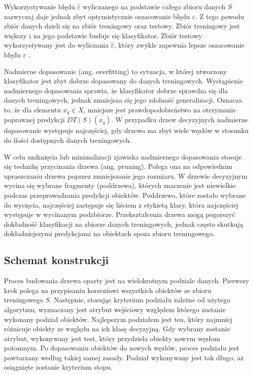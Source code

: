 \documentclass[12pt]{article}
\begin{document}
\vspace{0.8cm}

Wykorzystywanie błędu $\hat{\varepsilon}$ wyliczanego na podstawie całego zbioru danych $S$ zazwyczaj daje jednak
zbyt optymistycznie oszacowanie błędu $\varepsilon$. Z tego powodu zbiór danych dzieli się na zbiór
treningowy oraz testowy. Zbiór treningowy jest większy i na jego podstawie buduje się klasyfikator.
Zbiór testowy wykorzystywany jest do wyliczania $\hat{\varepsilon}$, który zwykle zapewnia
lepsze oszacowanie błędu $\varepsilon$ \cite{data-mining-with-decision-trees}.

Nadmierne dopasowanie (ang. overfitting) to sytuacja, w której utworzony klasyfikator jest zbyt
dobrze dopasowany do danych treningowych. Wystąpienie nadmiernego dopasowania sprawia, że
klasyfikator dobrze sprawdza się dla danych treningowych, jednak zmniejsza się jego zdolność
generalizacji. Oznacza to, że dla elementu $x_q \in X$, mniejsze jest prawdopodobieństwo na otrzymanie
poprawnej predykcji $DT(S)(x_q)$. W przypadku drzew decyzyjnych nadmierne dopasowanie
występuje najczęściej, gdy drzewo ma zbyt wiele węzłów w stosunku do ilości dostępnych danych treningowych.

W celu uniknięcia lub minimalizacji zjawiska nadmiernego dopasowania stosuje się technikę przycinania drzewa (ang. pruning).
Polega ona na odpowiednim upraszczaniu drzewa poprzez zmniejszanie jego rozmiaru.
W drzewie decyzyjnym wycina się wybrane fragmenty (poddrzewa), których znaczenie jest niewielkie podczas przeprowadzania
predykcji obiektów. Poddrzewo, które zostało wybrane do wycięcia, najczęściej zastępuje się liściem z etykietą klasy, która
najczęściej występuje w wycinanym podzbiorze. Przekształcenia drzewa mogą pogorszyć dokładność klasyfikacji
na zbiorze danych treningowych, jednak często skutkują dokładniejszymi predykcjami na obiektach spoza zbioru treningowego.

\subsection{Schemat konstrukcji}
Proces budowania drzewa oparty jest na wielokrotnym podziale danych. Pierwszy krok polega na przypisaniu
korzeniowi wszystkich obiektów ze zbioru treningowego $S$. Następnie, stosując kryterium podziału zależne od
użytego algorytmu, wyznaczany jest atrybut wejściowy względem którego zostanie wykonany podział obiektów.
Najlepszym podziałem jest ten, który najmniej różnicuje obiekty ze względu na ich klasę decyzyjną.
Gdy wybrany zostanie atrybut, wykonywany jest test, który przydziela obiekty nowym węzłom potomnym.
Po dopasowaniu obiektów do nowych węzłów, proces podziału jest powtarzany według takiej samej zasady.
Podział wykonywany jest tak długo, aż osiągnięte zostanie kryterium stopu.
\end{document}
